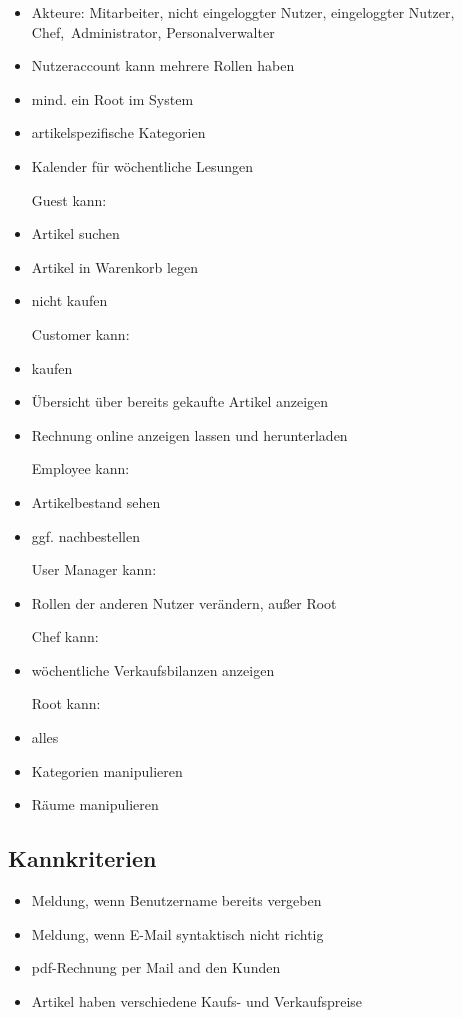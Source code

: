 \documentclass[a4paper]{article}
\begin{document}
\begin{itemize}
	\item Akteure: Mitarbeiter, nicht eingeloggter Nutzer, eingeloggter Nutzer, Chef,\ Administrator, Personalverwalter
	\item Nutzeraccount kann mehrere Rollen haben
	\item mind. ein Root im System
	\item artikelspezifische Kategorien
	\item Kalender für wöchentliche Lesungen
	\item[Guest kann:]
	\item Artikel suchen
	\item Artikel in Warenkorb legen
	\item nicht kaufen
	\item[Customer kann:]
	\item kaufen
	\item Übersicht über bereits gekaufte Artikel anzeigen
	\item Rechnung online anzeigen lassen und herunterladen
	\item[Employee kann:]
	\item Artikelbestand sehen
	\item ggf. nachbestellen
	\item[User Manager kann:]
	\item Rollen der anderen Nutzer verändern, außer Root
	\item[Chef kann:]
	\item wöchentliche Verkaufsbilanzen anzeigen
	\item[Root kann:]
	\item alles
	\item Kategorien manipulieren
	\item Räume manipulieren
\end{itemize}

\subsection{Kannkriterien}

\begin{itemize}
	\item Meldung, wenn Benutzername bereits vergeben
	\item Meldung, wenn E-Mail syntaktisch nicht richtig
	\item pdf-Rechnung per Mail and den Kunden
	\item Artikel haben verschiedene Kaufs- und Verkaufspreise
\end{itemize}
\end{document}
